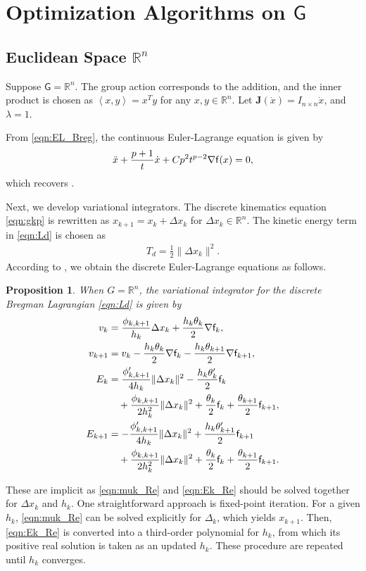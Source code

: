 \documentclass[letterpaper, 10pt, conference]{ieeeconf}
\newcommand{\G}{\ensuremath{\mathsf{G}}}
\renewcommand{\Re}{\ensuremath{\mathbb{R}}}
\newcommand{\pair}[1]{\ensuremath{\left\langle #1 \right\rangle}}
\newtheorem{prop}{Proposition}
\begin{document}
\section{Optimization Algorithms on $\G$}

\subsection{Euclidean Space $\Re^n$}

Suppose $\G=\Re^n$. 
The group action corresponds to the addition, and the inner product is chosen as $\pair{x,y}=x^Ty$ for any $x,y\in\Re^n$.
Let $\mathbf{J}(\dot x) = I_{n\times n} \dot x$, and $\lambda =1$. 

From \eqref{eqn:EL_Breg}, the continuous Euler-Lagrange equation is given by
\begin{align}
    \ddot x + \frac{p+1}{t} \dot x + Cp^2 t^{p-2} \nabla \mathsf{f}(x) = 0,\label{eqn:EL_Re}
\end{align}
which recovers \cite{wibisono2016variational}.

Next, we develop variational integrators. 
The discrete kinematics equation \eqref{eqn:gkp} is rewritten as $x_{k+1} = x_k + \Delta x_k$ for $\Delta x_k\in\Re^n$.
The kinetic energy term in \eqref{eqn:Ld} is chosen as
\begin{align*}
    T_d =\frac{1}{2}\|\Delta x_k\|^2.
\end{align*}
According to , we obtain the discrete Euler-Lagrange equations as follows.

\begin{prop}
    When $G=\Re^n$, the variational integrator for the discrete Bregman Lagrangian \eqref{eqn:Ld} is given by 
\begin{align}
    v_k & =  \frac{\phi_{k,k+1}}{h_k}\Delta x_k + \frac{h_k\theta_k}{2} \nabla \mathsf{f}_k,\label{eqn:muk_Re} \\
    v_{k+1} & = v_k - \frac{h_k\theta_k}{2} \nabla\mathsf{f}_k  -\frac{h_k\theta_{k+1}}{2} \nabla \mathsf{f}_{k+1},  \label{eqn:mukp_Re}\\
    E_{k} & = \frac{\phi'_{k,k+1}}{ 4 h_k} \|\Delta x_k\|^2 -\frac{h_k\theta'_{k}}{2} \mathsf{f}_{k} \nonumber\\\
          & \quad + \frac{\phi_{k,k+1}}{2 h_k^2}\|\Delta x_k\|^2 + \frac{\theta_k}{2}\mathsf{f}_k + \frac{\theta_{k+1}}{2}\mathsf{f}_{k+1},\label{eqn:Ek_Re}\\
    E_{k+1} & = -\frac{\phi'_{k,k+1}}{ 4 h_k} \|\Delta x_k\|^2 +\frac{h_k\theta'_{k+1}}{2} \mathsf{f}_{k+1}\nonumber \\\
            & \quad + \frac{\phi_{k,k+1}}{2 h_k^2}\|\Delta x_k\|^2 +\frac{\theta_k}{2}\mathsf{f}_k + \frac{\theta_{k+1}}{2}\mathsf{f}_{k+1}.
\end{align}
\end{prop}
These are implicit as \eqref{eqn:muk_Re} and \eqref{eqn:Ek_Re} should be solved together for $\Delta x_k$ and $h_k$.
One straightforward approach is fixed-point iteration.
For a given $h_k$, \eqref{eqn:muk_Re} can be solved explicitly for $\Delta_k$, which yields $x_{k+1}$. 
Then, \eqref{eqn:Ek_Re} is converted into a third-order polynomial for $h_k$, from which its positive real solution is taken as an updated $h_k$. 
These procedure are repeated until $h_k$ converges. 
\end{document}
